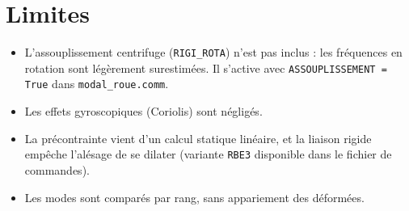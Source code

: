 \documentclass[11pt,a4paper]{article}
\begin{document}
\section{Limites}
\begin{itemize}\setlength\itemsep{1pt}
\item L'assouplissement centrifuge (\texttt{RIGI\_ROTA}) n'est pas inclus :
      les fréquences en rotation sont légèrement surestimées. Il s'active
      avec \texttt{ASSOUPLISSEMENT = True} dans \texttt{modal\_roue.comm}.
\item Les effets gyroscopiques (Coriolis) sont négligés.
\item La précontrainte vient d'un calcul statique linéaire, et la liaison
      rigide empêche l'alésage de se dilater (variante \texttt{RBE3}
      disponible dans le fichier de commandes).
\item Les modes sont comparés par rang, sans appariement des déformées.
\end{itemize}
\end{document}
